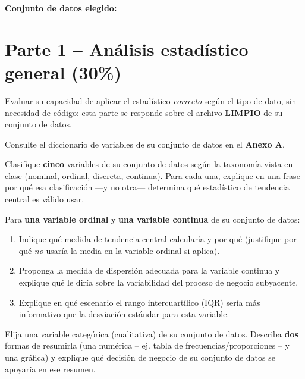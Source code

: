 \documentclass[11pt]{article}
\begin{document}
\noindent\textbf{Conjunto de datos elegido: \underline{\hspace{4cm}}}

\section{Parte 1 -- Análisis estadístico general (30\%)}
\begin{contexto}
Evaluar su capacidad de aplicar el estadístico \emph{correcto} según el tipo de dato, sin necesidad de código: esta parte se responde sobre el archivo \textbf{LIMPIO} de su conjunto de datos.
\end{contexto}

\noindent Consulte el diccionario de variables de su conjunto de datos en el \textbf{Anexo A}.

\begin{pregunta}
Clasifique \textbf{cinco} variables de su conjunto de datos según la taxonomía vista en clase (nominal, ordinal, discreta, continua). Para cada una, explique en una frase por qué esa clasificación —y no otra— determina qué estadístico de tendencia central es válido usar.
\end{pregunta}

\begin{pregunta}
Para \textbf{una variable ordinal} y \textbf{una variable continua} de su conjunto de datos:
\begin{enumerate}[label=\alph*)]
  \item Indique qué medida de tendencia central calcularía y por qué (justifique por qué \emph{no} usaría la media en la variable ordinal si aplica).
  \item Proponga la medida de dispersión adecuada para la variable continua y explique qué le diría sobre la variabilidad del proceso de negocio subyacente.
  \item Explique en qué escenario el rango intercuartílico (IQR) sería más informativo que la desviación estándar para esta variable.
\end{enumerate}
\end{pregunta}

\begin{pregunta}
Elija una variable categórica (cualitativa) de su conjunto de datos. Describa \textbf{dos} formas de resumirla (una numérica -- ej. tabla de frecuencias/proporciones -- y una gráfica) y explique qué decisión de negocio de su conjunto de datos se apoyaría en ese resumen.
\end{pregunta}
\end{document}
